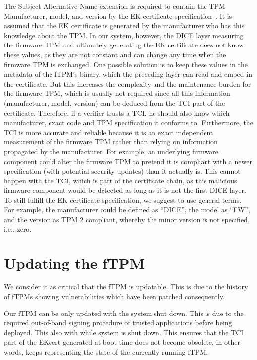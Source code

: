 The Subject Alternative Name extension is required to contain the TPM Manufacturer, model, and version by the EK certificate specification~\cite{tcg-ek}.
It is assumed that the EK certificate is generated by the manufacturer who has this knowledge about the TPM\@.
In our system, however, the DICE layer measuring the firmware TPM and ultimately generating the EK certificate does not know these values, as they are not constant and can change any time when the firmware TPM is exchanged.
One possible solution is to keep these values in the metadata of the fTPM's binary, which the preceding layer can read and embed in the certificate.
But this increases the complexity and the maintenance burden for the firmware TPM, which is usually not required since all this information (manufacturer, model, version) can be deduced from the TCI part of the certificate.
Therefore, if a verifier trusts a TCI, he should also know which manufacturer, exact code and TPM specification it conforms to.
Furthermore, the TCI is more accurate and reliable because it is an exact independent measurement of the firmware TPM rather than relying on information propagated by the manufacturer.
For example, an underlying firmware component could alter the firmware TPM to pretend it is compliant with a newer specification (with potential security updates) than it actually is.
This cannot happen with the TCI, which is part of the certificate chain, as this malicious firmware component would be detected as long as it is not the first DICE layer.
To still fulfill the EK certificate specification, we suggest to use general terms.
For example, the manufacturer could be defined as ``DICE'', the model as ``FW'', and the version as TPM 2 compliant, whereby the minor version is not specified, i.e., zero.


\section{Updating the fTPM}

We consider it as critical that the \ac{fTPM} is updatable. This is due to the history of \acp{fTPM} showing vulnerabilities which have been patched consequently. %

Our \ac{fTPM} can be only updated with the system shut down. This is due to the required out-of-band signing procedure of trusted applications before being deployed. This also  with while system is shut down. This ensures that the TCI part of the EKcert generated at boot-time does not become obsolete, in other words, keeps representing the state of the currently running fTPM\@.

